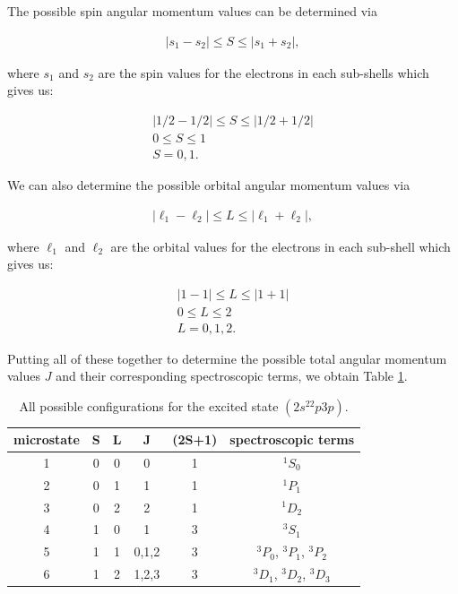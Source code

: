 \documentclass[12pt]{article}
\begin{document}
The possible spin angular momentum values can be determined via

\begin{align*}
|s_1 - s_2| \leq S \leq |s_1 + s_2|,
\end{align*}

where $s_1$ and $s_2$ are the spin values for the electrons in each sub-shells which gives us:

\begin{align*}
|1/2 - 1/2| \leq S \leq |1/2 + 1/2| \\
0 \leq S \leq 1 \\
S = 0, 1.
\end{align*}

We can also determine the possible orbital angular momentum values via

\begin{align*}
|\ell_1 - \ell_2| \leq L \leq |\ell_1 + \ell_2|,
\end{align*}

where $\ell_1$ and $\ell_2$ are the orbital values for the electrons in each sub-shell which gives us:

\begin{align*}
|1 - 1| \leq L \leq |1 + 1| \\
0 \leq L \leq 2 \\
L = 0, 1, 2.
\end{align*}

Putting all of these together to determine the possible total angular momentum values $J$ and their corresponding spectroscopic terms, we obtain Table \ref{table:config2_table1}.

\begin{table}[ht]
\centering
\caption{All possible configurations for the excited state $(2s^22p3p)$.}
\label{table:config2_table1}
\begin{tabular}{|c|cccc|c|}
\hline
microstate & S & L & J & (2S+1) & spectroscopic terms \\
\hline
1 & 0 & 0 & 0     & 1 & $^1S_0$ \\
2 & 0 & 1 & 1     & 1 & $^1P_1$ \\
3 & 0 & 2 & 2     & 1 & $^1D_2$ \\
4 & 1 & 0 & 1     & 3 & $^3S_1$ \\
5 & 1 & 1 & 0,1,2 & 3 & $^3P_0$, $^3P_1$, $^3P_2$ \\
6 & 1 & 2 & 1,2,3 & 3 & $^3D_1$, $^3D_2$, $^3D_3$ \\
\hline
\end{tabular}
\end{table}
\end{document}
